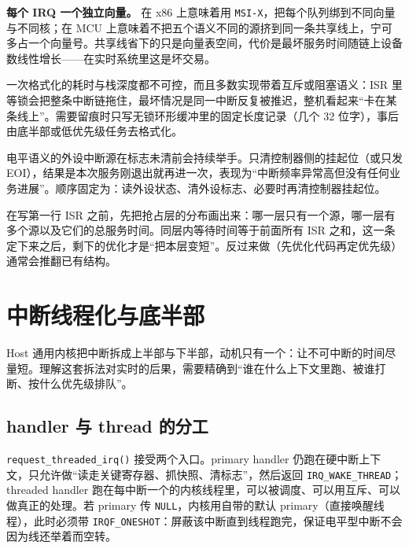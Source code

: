 \documentclass[12pt,a4paper,fontset=fandol]{ctexbook}
\newcommand{\Fn}[1]{\texttt{#1()}}
\newcommand{\Tp}[1]{\texttt{#1}}
\newcommand{\Lang}[1]{\textsf{#1}}
\newcommand{\DomHost}{\Lang{Host}}
\begin{document}
\textbf{每个 IRQ 一个独立向量。} 在 x86 上意味着用 \Tp{MSI-X}，把每个队列绑到不同向量与不同核；在 MCU 上意味着不把五个语义不同的源挤到同一条共享线上，宁可多占一个向量号。共享线省下的只是向量表空间，代价是最坏服务时间随链上设备数线性增长——在实时系统里这是坏交易。

\begin{warning}[title={在 ISR 里调用 \Tp{printf} 或日志函数}]
一次格式化的耗时与栈深度都不可控，而且多数实现带着互斥或阻塞语义：ISR 里等锁会把整条中断链拖住，最坏情况是同一中断反复被推迟，整机看起来``卡在某条线上''。需要留痕时只写无锁环形缓冲里的固定长度记录（几个 32 位字），事后由底半部或低优先级任务去格式化。
\end{warning}

\begin{note}[title={清挂起位的顺序：先清源，再谈返回}]
电平语义的外设中断源在标志未清前会持续举手。只清控制器侧的挂起位（或只发 EOI），结果是本次服务刚退出就再进一次，表现为``中断频率异常高但没有任何业务进展''。顺序固定为：读外设状态、清外设标志、必要时再清控制器挂起位。
\end{note}

\begin{guideline}[title={优先级先于代码长度}]
在写第一行 ISR 之前，先把抢占层的分布画出来：哪一层只有一个源，哪一层有多个源以及它们的总服务时间。同层内等待时间等于前面所有 ISR 之和，这一条定下来之后，剩下的优化才是``把本层变短''。反过来做（先优化代码再定优先级）通常会推翻已有结构。
\end{guideline}

\section{中断线程化与底半部}
\label{sec:ch03-threading}

\DomHost{} 通用内核把中断拆成上半部与下半部，动机只有一个：让不可中断的时间尽量短。理解这套拆法对实时的后果，需要精确到``谁在什么上下文里跑、被谁打断、按什么优先级排队''。

\subsection{handler 与 thread 的分工}

\Fn{request\_threaded\_irq} 接受两个入口。primary handler 仍跑在硬中断上下文，只允许做``读走关键寄存器、抓快照、清标志''，然后返回 \Tp{IRQ\_WAKE\_THREAD}；threaded handler 跑在每中断一个的内核线程里，可以被调度、可以用互斥、可以做真正的处理。若 primary 传 \Tp{NULL}，内核用自带的默认 primary（直接唤醒线程），此时必须带 \Tp{IRQF\_ONESHOT}：屏蔽该中断直到线程跑完，保证电平型中断不会因为线还举着而空转。
\end{document}
